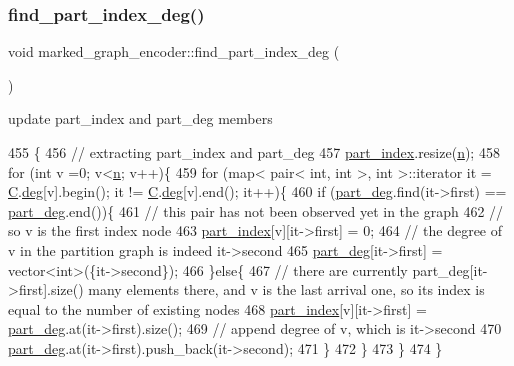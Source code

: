 \subsubsection{\texorpdfstring{find\+\_\+part\+\_\+index\+\_\+deg()}{find\_part\_index\_deg()}}
{\footnotesize\ttfamily void marked\+\_\+graph\+\_\+encoder\+::find\+\_\+part\+\_\+index\+\_\+deg (\begin{DoxyParamCaption}{ }\end{DoxyParamCaption})\hspace{0.3cm}{\ttfamily [private]}}



update part\+\_\+index and part\+\_\+deg members 


\begin{DoxyCode}
455 \{
456   \textcolor{comment}{// extracting part\_index and part\_deg}
457   \hyperlink{classmarked__graph__encoder_a1d3e2b90f5d46244fd4cb33c69ac81f1}{part\_index}.resize(\hyperlink{classmarked__graph__encoder_a4c66d9fdbc14c97523715aac7e4511cb}{n});
458   \textcolor{keywordflow}{for} (\textcolor{keywordtype}{int} v =0; v<\hyperlink{classmarked__graph__encoder_a4c66d9fdbc14c97523715aac7e4511cb}{n}; v++)\{
459     \textcolor{keywordflow}{for} (map< pair< int, int >, \textcolor{keywordtype}{int} >::iterator it = \hyperlink{classmarked__graph__encoder_af82bc0653414091291cb75553a407bdb}{C}.\hyperlink{classcolored__graph_ae3269d35c1b022bc70d195bebd4e1b8a}{deg}[v].begin(); it != 
      \hyperlink{classmarked__graph__encoder_af82bc0653414091291cb75553a407bdb}{C}.\hyperlink{classcolored__graph_ae3269d35c1b022bc70d195bebd4e1b8a}{deg}[v].end(); it++)\{
460       \textcolor{keywordflow}{if} (\hyperlink{classmarked__graph__encoder_a55ea2edb2609dfc287432f61900d6ad1}{part\_deg}.find(it->first) == \hyperlink{classmarked__graph__encoder_a55ea2edb2609dfc287432f61900d6ad1}{part\_deg}.end())\{
461         \textcolor{comment}{// this pair has not been observed yet in the graph}
462         \textcolor{comment}{// so v is the first index node}
463         \hyperlink{classmarked__graph__encoder_a1d3e2b90f5d46244fd4cb33c69ac81f1}{part\_index}[v][it->first] = 0;
464         \textcolor{comment}{// the degree of v in the partition graph is indeed it->second}
465         \hyperlink{classmarked__graph__encoder_a55ea2edb2609dfc287432f61900d6ad1}{part\_deg}[it->first] = vector<int>(\{it->second\}); 
466       \}\textcolor{keywordflow}{else}\{
467         \textcolor{comment}{// there are currently part\_deg[it->first].size() many elements there, and v is the last arrival
       one, so its index is equal to the number of existing nodes }
468         \hyperlink{classmarked__graph__encoder_a1d3e2b90f5d46244fd4cb33c69ac81f1}{part\_index}[v][it->first] = \hyperlink{classmarked__graph__encoder_a55ea2edb2609dfc287432f61900d6ad1}{part\_deg}.at(it->first).size();
469         \textcolor{comment}{// append degree of v, which is it->second}
470         \hyperlink{classmarked__graph__encoder_a55ea2edb2609dfc287432f61900d6ad1}{part\_deg}.at(it->first).push\_back(it->second); 
471       \}
472     \}
473   \}
474 \}
\end{DoxyCode}


